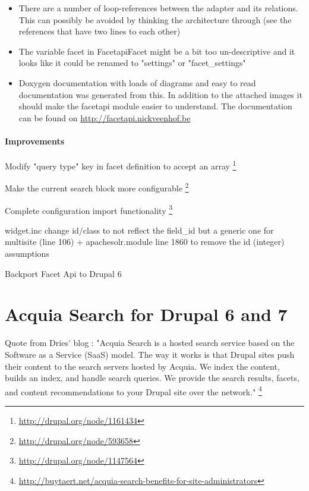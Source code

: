 \begin{itemize}
\item There are a number of loop-references between the adapter and its relations. This can possibly be avoided by thinking the architecture through (see the references that have two lines to each other)
\item The variable facet in FacetapiFacet might be a bit too un-descriptive and it looks like it could be renamed to "settings" or "facet\_settings"
\item Doxygen documentation with loads of diagrams and easy to read documentation was generated from this. In addition to the attached images it should make the facetapi module easier to understand. The documentation can be found on \url{http://facetapi.nickveenhof.be}
\end{itemize}

\paragraph{Improvements}
\begin{packed_itemize}
\item Modify "query type" key in facet definition to accept an array \footnote{\url{http://drupal.org/node/1161434}}
\item Make the current search block more configurable \footnote{\url{http://drupal.org/node/593658}}
\item Complete configuration import functionality \footnote{\url{http://drupal.org/node/1147564}}
\item widget.inc change id/class to not reflect the field\_id but a generic one for multisite (line 106) + apachesolr.module line 1860 to remove the id (integer) assumptions
\item Backport Facet Api to Drupal 6
\end{packed_itemize}

\section{Acquia Search for Drupal 6 and 7}
Quote from Dries' blog : "Acquia Search is a hosted search service based on the Software as a Service (SaaS) model. The way it works is that Drupal sites push their content to the search servers hosted by Acquia. We index the content, builds an index, and handle search queries. We provide the search results, facets, and content recommendations to your Drupal site over the network." \footnote{\url{http://buytaert.net/acquia-search-benefits-for-site-administrators}}

